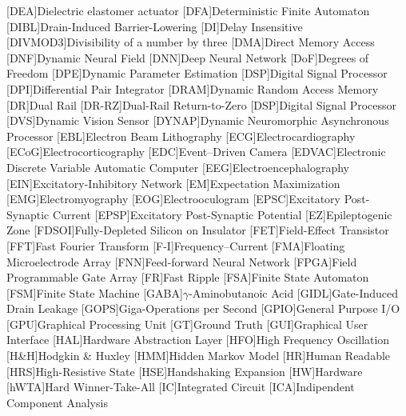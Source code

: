 [DEA]{Dielectric elastomer actuator}
[DFA]{Deterministic Finite Automaton}
[DIBL]{Drain-Induced Barrier-Lowering}
[DI]{Delay Insensitive}
[DIVMOD3]{Divisibility of a number by three}
[DMA]{Direct Memory Access}
[DNF]{Dynamic Neural Field}
[DNN]{Deep Neural Network}
[DoF]{Degrees of Freedom}
[DPE]{Dynamic Parameter Estimation}
[DSP]{Digital Signal Processor}
[DPI]{Differential Pair Integrator}
[DRAM]{Dynamic Random Access Memory}
[DR]{Dual Rail}
[DR-RZ]{Dual-Rail Return-to-Zero}
[DSP]{Digital Signal Processor}
[DVS]{Dynamic Vision Sensor}
[DYNAP]{Dynamic Neuromorphic Asynchronous Processor}
[EBL]{Electron Beam Lithography}
[ECG]{Electrocardiography}
[ECoG]{Electrocorticography}
[EDC]{Event--Driven Camera}
[EDVAC]{Electronic Discrete Variable Automatic Computer}
[EEG]{Electroencephalography}
[EIN]{Excitatory-Inhibitory Network}
[EM]{Expectation Maximization}
[EMG]{Electromyography}
[EOG]{Electrooculogram}
[EPSC]{Excitatory Post-Synaptic Current}
[EPSP]{Excitatory Post-Synaptic Potential}
[EZ]{Epileptogenic Zone}
[FDSOI]{Fully-Depleted Silicon on Insulator}
[FET]{Field-Effect Transistor}
[FFT]{Fast Fourier Transform}
[F-I]{Frequency--Current}
[FMA]{Floating Microelectrode Array} 
[FNN]{Feed-forward Neural Network}
[FPGA]{Field Programmable Gate Array}
[FR]{Fast Ripple}
[FSA]{Finite State Automaton}
[FSM]{Finite State Machine}
[GABA]{$\gamma$-Aminobutanoic Acid}
[GIDL]{Gate-Induced Drain Leakage}
[GOPS]{Giga-Operations per Second}
[GPIO]{General Purpose I/O}
[GPU]{Graphical Processing Unit}
[GT]{Ground Truth}
[GUI]{Graphical User Interface}
[HAL]{Hardware Abstraction Layer}
[HFO]{High Frequency Oscillation}
[H\&H]{Hodgkin \& Huxley}
[HMM]{Hidden Markov Model}
[HR]{Human Readable}
[HRS]{High-Resistive State}
[HSE]{Handshaking Expansion}
[HW]{Hardware}
[hWTA]{Hard Winner-Take-All}
[IC]{Integrated Circuit}
[ICA]{Indipendent Component Analysis}
